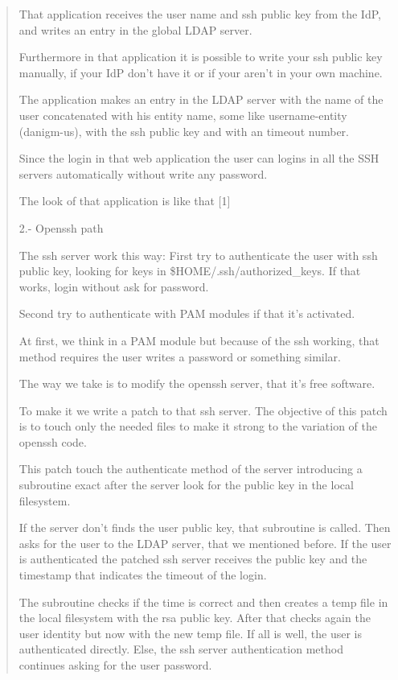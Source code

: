 \begin{quote}
    That application receives the user name and ssh public
    key from the IdP, and writes an entry in the global LDAP server.

    Furthermore in that application it is possible to write your
    ssh public key manually, if your IdP don't have it or if your
    aren't in your own machine.

    The application makes an entry in the LDAP server with the name of
    the user concatenated with his entity name, some like
    username-entity (danigm-us), with the ssh public key and with an
    timeout number.

    Since the login in that web application the user can logins in all
    the SSH servers automatically without write any password.

    The look of that application is like that [1]

    2.- Openssh path
    
    The ssh server work this way:
        First try to authenticate the user with ssh public key,
        looking for keys in \$HOME/.ssh/authorized\_keys. If that works,
        login without ask for password.

        Second try to authenticate with PAM modules if that it's
        activated.

    At first, we think in a PAM module but because of the ssh
    working, that method requires the user writes a password or
    something similar.

    The way we take is to modify the openssh server, that it's
    free software.

    To make it we write a patch to that ssh server. The objective of
    this patch is to touch only the needed files to make it strong to
    the variation of the openssh code.

    This patch touch the authenticate method of the server
    introducing a subroutine exact after the server look for the
    public key in the local filesystem. 

    If the server don't finds the user public key, that subroutine is
    called. Then asks for the user to the LDAP server, that we mentioned
    before. If the user is authenticated the patched ssh server
    receives the public key and the timestamp that indicates the
    timeout of the login.

    The subroutine checks if the time is correct and then creates a
    temp file in the local filesystem with the rsa public key. After
    that checks again the user identity but now with the new temp
    file. If all is well, the user is authenticated directly. Else,
    the ssh server authentication method continues asking for the user
    password.


\end{quote}
